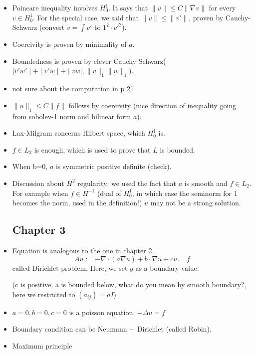 \documentclass{article}
\theoremstyle{remark}
\begin{document}
\begin{itemize}
    \item Poincare inequality involves $H_0^1$. It says that $\lVert v\rVert\leq C\lVert \nabla v\rVert$ for every $v\in H_0^1$. For the special case, we said that $\lVert v\rVert\leq \lVert v'\rVert$, proven by Cauchy-Schwarz (convert $v=\int v'$ to $1^2\cdot v'^2$).
    \item Coercivity is proven by minimality of $a$.
    \item Boundedness is proven by clever Cauchy Schwarz($\mid v'w'\mid+\mid v'w\mid+\mid vw\mid, \lVert v\rVert_1\lVert w\rVert_1$).
    \item not sure about the computation in p 21
    \item $\lVert u\rVert_1\leq C\lVert f\rVert$ follows by coercivity (nice direction of inequality going from sobolev-1 norm and bilinear form $a$).
    \item Lax-Milgram concerns Hilbert space, which $H_0^1$ is.
    \item $f\in L_2$ is enough, which is used to prove that $L$ is bounded.
    \item When b=0, $a$ is symmetric positive definite (check).
    \item Discussion about $H^2$ regularity: we used the fact that $a$ is smooth and $f\in L_2$. For example when $f\in H^{-1}$ (dual of $H_0^1$, in which case the seminorm for 1 becomes the norm, used in the definition!) $u$ may not be a strong solution.
    \subsection*{Chapter 3}
    \item Equation is analogous to the one in chapter 2. $$Au:=-\nabla \cdot (a\nabla u)+b\cdot\nabla u+cu=f$$ called Dirichlet problem. Here, we set $g$ as a boundary value.
    
    (c is positive, a is bounded below, what do you mean by smooth boundary?, here we restricted to $(a_{ij})=aI$)
    \item $a=0, b=0, c=0$ is a poisson equation, $-\Delta u=f$
    \item Boundary condition can be Neumann + Dirichlet (called Robin).
    \item Maximum principle


\end{itemize}
\end{document}
